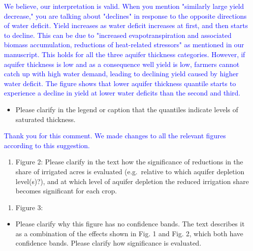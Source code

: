 \documentclass[
]{article}
\providecommand{\tightlist}{%
  \setlength{\itemsep}{0pt}\setlength{\parskip}{0pt}}
\begin{document}
\textcolor{blue}{We believe, our interpretation is valid. When you mention "similarly large yield decrease," you are talking about "declines" in response to the opposite directions of water deficit. Yield increases as water deficit increases at first, and then starts to decline. This can be due to "increased evapotranspiration and associated biomass accumulation, reductions of heat-related stressors" as mentioned in our manuscript. This holds for all the three aquifer thickness categories. However, if aquifer thickness is low and as a consequence well yield is low, farmers cannot catch up with high water demand, leading to declining yield caused by higher water deficit. The figure shows that lower aquifer thickness quantile starts to experience a decline in yield at lower water deficits than the second and third.}

\begin{itemize}
\tightlist
\item
  Please clarify in the legend or caption that the quantiles indicate
  levels of saturated thickness.
\end{itemize}

\textcolor{blue}{Thank you for this comment. We made changes to all the relevant figures according to this suggestion.}

\begin{enumerate}
\def\labelenumi{\arabic{enumi}.}
\setcounter{enumi}{2}
\tightlist
\item
  Figure 2: Please clarify in the text how the significance of
  reductions in the share of irrigated acres is evaluated (e.g.~relative
  to which aquifer depletion level(s)?), and at which level of aquifer
  depletion the reduced irrigation share becomes significant for each
  crop.
\end{enumerate}

\textcolor{blue}{}

\begin{enumerate}
\def\labelenumi{\arabic{enumi}.}
\setcounter{enumi}{3}
\tightlist
\item
  Figure 3:
\end{enumerate}

\begin{itemize}
\tightlist
\item
  Please clarify why this figure has no confidence bands. The text
  describes it as a combination of the effects shown in Fig. 1 and Fig.
  2, which both have confidence bands. Please clarify how significance
  is evaluated.
\end{itemize}
\end{document}
